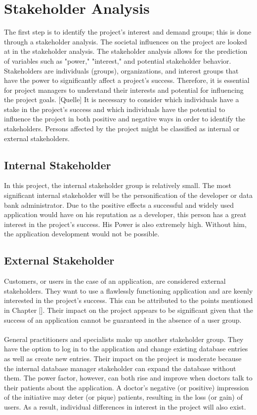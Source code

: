 \section{Stakeholder Analysis}
The first step is to identify the project's interest and demand groups; this is done through a stakeholder analysis. The societal influences on the project are looked at in the stakeholder analysis. The stakeholder analysis allows for the prediction of variables such as "power," "interest," and potential stakeholder behavior. Stakeholders are individuals (groups), organizations, and interest groups that have the power to significantly affect a project's success. Therefore, it is essential for project managers to understand their interests and potential for influencing the project goals. [Quelle] It is necessary to consider which individuals have a stake in the project's success and which individuals have the potential to influence the project in both positive and negative ways in order to identify the stakeholders.
Persons affected by the project might be classified as internal or external stakeholders. 
\subsection{Internal Stakeholder}
In this project, the internal stakeholder group is relatively small. The most significant internal stakeholder will be the personification of the developer or data bank administrator. Due to the positive effects a successful and widely used application would have on his reputation as a developer, this person has a great interest in the project's success. His Power is also extremely high. Without him, the application development would not be possible. 
\subsection{External Stakeholder}
Customers, or users in the case of an application, are considered external stakeholders. They want to use a flawlessly functioning application and are keenly interested in the project's success. This can be attributed to the points mentioned in Chapter []. Their impact on the project appears to be significant given that the success of an application cannot be guaranteed in the absence of a user group.
\\\\
General practitioners and specialists make up another stakeholder group.
They have the option to log in to the application and change existing database entries as well as create new entries. Their impact on the project is moderate because the internal database manager stakeholder can expand the database without them. The power factor, however, can both rise and improve when doctors talk to their patients about the application. A doctor's negative (or positive) impression of the initiative may deter (or pique) patients, resulting in the loss (or gain) of users. As a result, individual differences in interest in the project will also exist.

